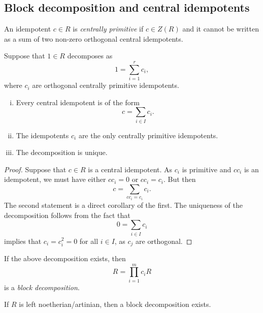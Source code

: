 \newpage

\subsection{Block decomposition and central idempotents}

\begin{definicija}
An idempotent $c \in R$ is
\emph{centrally primitive} if
$c \in Z(R)$ and it cannot be written as a sum of two non-zero
orthogonal central idempotents.
\end{definicija}

\begin{trditev}
Suppose that $1 \in R$ decomposes as
\[
1 = \sum_{i=1}^r c_i,
\]
where $c_i$ are orthogonal centrally primitive idempotents.

\begin{enumerate}[i)]
\item Every central idempotent is of the form
\[
c = \sum_{i \in I} c_i.
\]
\item The idempotents $c_i$ are the only centrally primitive
idempotents.
\item The decomposition is unique.
\end{enumerate}
\end{trditev}

\begin{proof}
Suppose that $c \in R$ is a central idempotent. As $c_i$ is
primitive and $c c_i$ is an idempotent, we must have either
$c c_i = 0$ or $c c_i = c_i$. But then
\[
c = \sum_{c c_i = c_i} c_i.
\]
The second statement is a direct corollary of the first. The
uniqueness of the decomposition follows from the fact that
\[
0 = \sum_{i \in I} c_i
\]
implies that $c_i = c_i^2 = 0$ for all $i \in I$, as $c_j$ are
orthogonal.
\end{proof}

\begin{definicija}
If the above decomposition exists, then
\[
R = \prod_{i=1}^m c_i R
\]
is a \emph{block decomposition}.
\end{definicija}

\begin{izrek}
If $R$ is left noetherian/artinian, then a block decomposition
exists.
\end{izrek}

